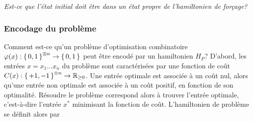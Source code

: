\textcolor{mydarkred}{\textit{Est-ce que l'état initial doit être dans un état propre de l'hamiltonien de forçage?}}


\subsubsection{Encodage du problème}
\label{subsec:encodage-probleme}

Comment est-ce qu'un problème d'optimisation combinatoire $\varphi(x):\set{ 0, 1 }^{\otimes n} \to \set{ 0, 1 }$ peut être encodé par un hamiltonien $H_{P}$? D'abord, les entrées $x = x_{1} \dots x_{n}$ du problème sont caractérisées par une fonction de coût $C(x):\set{ +1, -1 }^{\otimes n} \to \mathbb{R}_{\geq 0}$. Une entrée optimale est associée à un coût nul, alors qu'une entrée non optimale est associée à un coût positif, en fonction de son optimalité. Résoudre le problème correspond alors à trouver l'entrée optimale, c'est-à-dire l'entrée $x^{*}$ minimisant la fonction de coût. L'hamiltonien de problème se définit alors par

